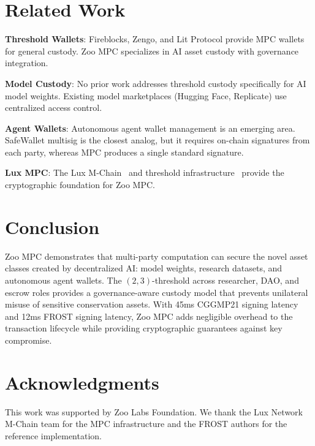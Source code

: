 \documentclass[11pt,letterpaper]{article}
\begin{document}
\section{Related Work}

\textbf{Threshold Wallets}: Fireblocks, Zengo, and Lit Protocol provide MPC wallets for general custody. Zoo MPC specializes in AI asset custody with governance integration.

\textbf{Model Custody}: No prior work addresses threshold custody specifically for AI model weights. Existing model marketplaces (Hugging Face, Replicate) use centralized access control.

\textbf{Agent Wallets}: Autonomous agent wallet management is an emerging area. Safe{Wallet} multisig is the closest analog, but it requires on-chain signatures from each party, whereas MPC produces a single standard signature.

\textbf{Lux MPC}: The Lux M-Chain~\cite{lux-mchain-mpc} and threshold infrastructure~\cite{lux-threshold} provide the cryptographic foundation for Zoo MPC.

\section{Conclusion}

Zoo MPC demonstrates that multi-party computation can secure the novel asset classes created by decentralized AI: model weights, research datasets, and autonomous agent wallets. The $(2, 3)$-threshold across researcher, DAO, and escrow roles provides a governance-aware custody model that prevents unilateral misuse of sensitive conservation assets. With 45ms CGGMP21 signing latency and 12ms FROST signing latency, Zoo MPC adds negligible overhead to the transaction lifecycle while providing cryptographic guarantees against key compromise.

\section*{Acknowledgments}

This work was supported by Zoo Labs Foundation. We thank the Lux Network M-Chain team for the MPC infrastructure and the FROST authors for the reference implementation.
\end{document}
